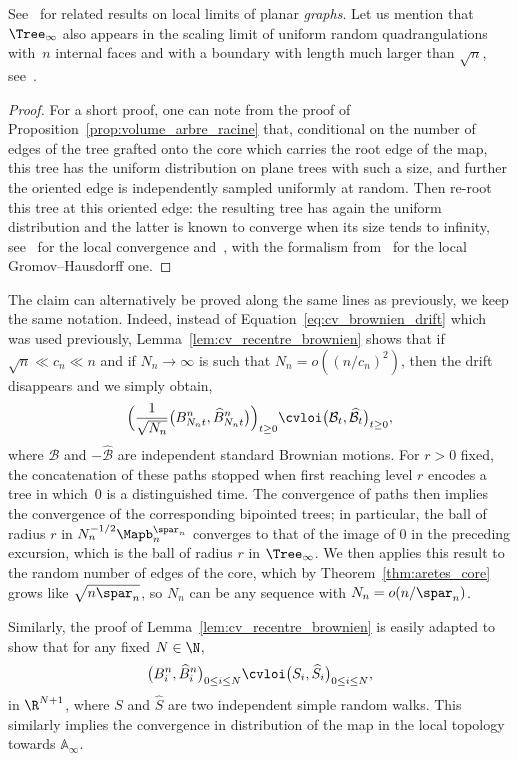See~\cite{KM21a} for related results on local limits of planar \emph{graphs}.
Let us mention that $\Tree_\infty$ also appears in the scaling limit of uniform random quadrangulations with~$n$ internal faces and with a boundary with length much larger than $\sqrt{n}$, see~\cite[Th.\,3.4]{BMR19}.

\begin{proof}
For a short proof, one can note from the proof of Proposition~\ref{prop:volume_arbre_racine} that, conditional on the number of edges of the tree grafted onto the core which carries the root edge of the map, this tree has the uniform distribution on plane trees with such a size, and further the oriented edge is independently sampled uniformly at random. Then re-root this tree at this oriented edge: the resulting tree has again the uniform distribution and the latter is known to converge when its size tends to infinity, see~\cite[Th.\,7.1]{Jan12} for the local convergence and~\cite[\S 2.5]{Ald91c}, with the formalism from~\cite{DLG05} for the local Gromov--Hausdorff one.
\end{proof}

The claim can alternatively be proved along the same lines as previously, we keep the same notation.
Indeed, instead of Equation~\eqref{eq:cv_brownien_drift} which was used previously, Lemma~\ref{lem:cv_recentre_brownien} shows that if $\sqrt{n} \ll c_n \ll n$ and if $N_{n} \to \infty$ is such that $N_{n} = o((n/c_{n})^2)$, then the drift disappears and we simply obtain,
\[
\Bigl(\frac{1}{\sqrt{N_{n}}} \bigl(B^{n}_{N_{n}t}, \widehat{B}^{n}_{N_{n}t}\bigr)\Bigl)_{t \ge 0}
\cvloi \bigl(\mathcal{B}_{t}, \widehat{\mathcal{B}}_{t}\bigr)_{t \ge 0},
\]
where $\mathcal{B}$ and $-\widehat{\mathcal{B}}$ are independent standard Brownian motions.
For $r>0$ fixed, the concatenation of these paths stopped when first reaching level $r$ encodes a tree in which~$0$ is a distinguished time.
The convergence of paths then implies the convergence of the corresponding bipointed trees; in particular, the ball of radius $r$ in $N_n^{-1/2} \Mapb_n^{\spar_n}$ converges to that of the image of $0$ in the preceding excursion, which is the ball of radius $r$ in $\Tree_\infty$.
We then applies this result to the random number of edges of the core, which by Theorem~\ref{thm:aretes_core} grows like $\sqrt{n\spar_n}$, so $N_n$ can be any sequence with $N_n = o(n/\spar_n)$.

Similarly, the proof of Lemma~\ref{lem:cv_recentre_brownien} is easily adapted to show that
for any fixed $N \in \N$,
\[
\big(B^{n}_{i}, \widehat{B}^{n}_{i}\big)_{0 \le i \le N} \cvloi \big(S_{i}, \widehat{S}_{i}\big)_{0 \le i \le N},
\]
in $\R^{N+1}$, where $S$ and $\widehat{S}$ are two independent simple random walks.
This similarly implies the convergence in distribution of the map in the local topology towards $\mathbb{A}_\infty$.

